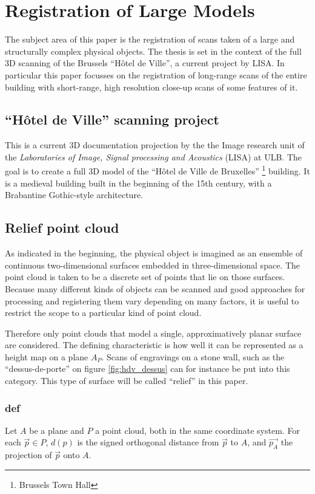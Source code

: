 \chapter{Registration of Large Models}
The subject area of this paper is the registration of scans taken of a large and structurally complex physical objects. The thesis is set in the context of the full 3D scanning of the Brussels ``Hôtel de Ville'', a current project by LISA. In particular this paper focusses on the registration of long-range scans of the entire building with short-range, high resolution close-up scans of some features of it.


\section{``Hôtel de Ville'' scanning project}
This is a current 3D documentation projection by the the Image research unit of the \emph{Laboratories of Image, Signal processing and Acoustics} (LISA) at ULB. The goal is to create a full 3D model of the ``Hôtel de Ville de Bruxelles'' \footnote{Brussels Town Hall} building. It is a medieval building built in the beginning of the 15th century, with a Brabantine Gothic-style architecture.


\section{Relief point cloud}
As indicated in the beginning, the physical object is imagined as an ensemble of continuous two-dimensional surfaces embedded in three-dimensional space. The point cloud is taken to be a discrete set of points that lie on those surfaces. Because many different kinds of objects can be scanned and good approaches for processing and registering them vary depending on many factors, it is useful to restrict the scope to a particular kind of point cloud.

Therefore only point clouds that model a single, approximatively planar surface are considered. The defining characteristic is how well it can be represented as a height map on a plane $A_P$. Scans of engravings on a stone wall, such as the ``dessus-de-porte'' on figure \ref{fig:hdv_dessus} can for instance be put into this category. This type of surface will be called ``relief'' in this paper.

\subsection{def}
Let $A$ be a plane and $P$ a point cloud, both in the same coordinate system. For each $\vec{p} \in P$, $d(p)$ is the signed orthogonal distance from $\vec{p}$ to $A$, and $\vec{p_A}$ the projection of $\vec{p}$ onto $A$.



